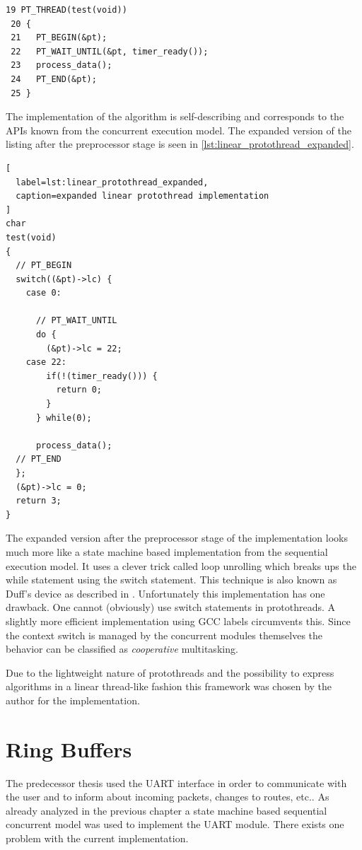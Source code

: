 \begin{lstlisting}[label=lst:linear_protothread,caption=linear protothread implementation]
 19 PT_THREAD(test(void))
 20 {
 21   PT_BEGIN(&pt);
 22   PT_WAIT_UNTIL(&pt, timer_ready());
 23   process_data();
 24   PT_END(&pt);
 25 }
\end{lstlisting}

The implementation of the algorithm is self-describing and corresponds to the APIs known from the concurrent execution model. The expanded version of the listing after the preprocessor stage is seen in \ref{lst:linear_protothread_expanded}.

\begin{lstlisting}[
  label=lst:linear_protothread_expanded,
  caption=expanded linear protothread implementation
]
char
test(void)
{
  // PT_BEGIN
  switch((&pt)->lc) {
    case 0:

      // PT_WAIT_UNTIL
      do {
        (&pt)->lc = 22;
    case 22:
        if(!(timer_ready())) {
          return 0;
        }
      } while(0);

      process_data();
  // PT_END
  };
  (&pt)->lc = 0;
  return 3;
}
\end{lstlisting}

The expanded version after the preprocessor stage of the implementation looks much more like a state machine based implementation from the sequential execution model. It uses a clever trick called loop unrolling \cite{abrash} which breaks ups the while statement using the switch statement. This technique is also known as Duff's device as described in \cite{duff}. Unfortunately this implementation has one drawback. One cannot (obviously) use switch statements in protothreads. A slightly more efficient implementation using GCC labels circumvents this. Since the context switch is managed by the concurrent modules themselves the behavior can be classified as \emph{cooperative} multitasking.

Due to the lightweight nature of protothreads and the possibility to express algorithms in a linear thread-like fashion this framework was chosen by the author for the implementation.

\section{Ring Buffers}
The predecessor thesis \cite{korniowski} used the UART interface in order to communicate with the user and to inform about incoming packets, changes to routes, etc.. As already analyzed in the previous chapter a state machine based sequential concurrent model was used to implement the UART module. There exists one problem with the current implementation.

